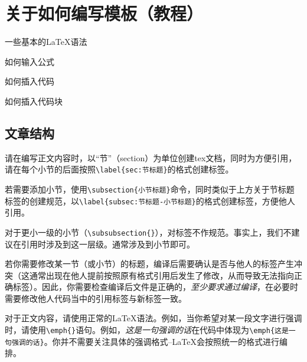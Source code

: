 \section{关于如何编写模板（教程）}\label{sec:关于如何编写模板（教程）}


\begin{Abstract}
    \item 一些基本的\LaTeX 语法
    \item 如何输入公式
    \item 如何插入代码
    \item 如何插入代码块
\end{Abstract}

\subsection{文章结构}\label{subsec:关于如何编写模板（教程）-文章结构}

请在编写正文内容时，以“节”（section）为单位创建tex文档，同时为方便引用，请在每个小节的后面按照\verb|\label{sec:节标题}|的格式创建标签。

若需要添加小节，使用\verb|\subsection{小节标题}|命令，同时类似于上方关于节标题标签的创建规范，以\verb|\label{subsec:节标题-小节标题}|的格式创建标签，方便他人引用。

对于更小一级的小节（\verb|\subsubsection{}|），对标签不作规范。事实上，我们不建议在引用时涉及到这一层级。通常涉及到小节即可。

\begin{attention}
    若你需要修改某一节（或小节）的标题，编译后需要确认是否与他人的标签产生冲突（这通常出现在他人提前按照原有格式引用后发生了修改，从而导致无法指向正确标签）。因此，你需要检查编译后文件是正确的，\emph{至少要求通过编译}，在必要时需要修改他人代码当中的引用标签与新标签一致。
\end{attention}

对于正文内容，请使用正常的\LaTeX 语法。例如，当你希望对某一段文字进行强调时，请使用\verb|\emph{}|语句。例如，\emph{这是一句强调的话}在代码中体现为\verb|\emph{这是一句强调的话}|。你并不需要关注具体的强调格式--\LaTeX 会按照统一的格式进行编排。

